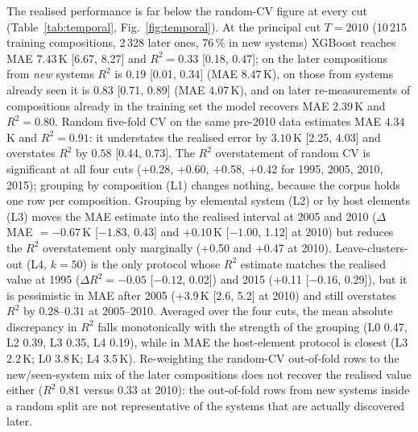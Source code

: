 The realised performance is far below the random-CV figure at every cut (Table~\ref{tab:temporal}, Fig.~\ref{fig:temporal}). At the
principal cut $T=2010$ (10\,215 training compositions, 2\,328 later ones, 76\,\% in new systems) XGBoost reaches MAE
$7.43$\,K [6.67, 8.27] and $R^2=0.33$ [0.18, 0.47]; on the later compositions from \emph{new} systems $R^2$ is $0.19$ [0.01, 0.34]
(MAE $8.47$\,K), on those from systems already seen it is $0.83$ [0.71, 0.89] (MAE $4.07$\,K), and on later re-measurements of
compositions already in the training set the model recovers MAE $2.39$\,K and $R^2=0.80$. Random five-fold CV on the same pre-2010
data estimates MAE $4.34$\,K and $R^2=0.91$: it understates the realised error by $3.10$\,K [2.25, 4.03] and overstates $R^2$ by
$0.58$ [0.44, 0.73]. The $R^2$ overstatement of random CV is significant at all four cuts (+0.28, +0.60, +0.58, +0.42 for 1995,
2005, 2010, 2015); grouping by composition (L1) changes nothing, because the corpus holds one row per composition. Grouping by
elemental system (L2) or by host elements (L3) moves the MAE estimate into the realised interval at 2005 and 2010
($\Delta$MAE $=-0.67$\,K [$-1.83$, 0.43] and $+0.10$\,K [$-1.00$, 1.12] at 2010) but reduces the $R^2$ overstatement only marginally
(+0.50 and +0.47 at 2010). Leave-clusters-out (L4, $k=50$) is the only protocol whose $R^2$ estimate matches the realised value at
1995 ($\Delta R^2=-0.05$ [$-0.12$, 0.02]) and 2015 (+0.11 [$-0.16$, 0.29]), but it is pessimistic in MAE after 2005
(+3.9\,K [2.6, 5.2] at 2010) and still overstates $R^2$ by $0.28$--$0.31$ at 2005--2010. Averaged over the four cuts, the mean
absolute discrepancy in $R^2$ falls monotonically with the strength of the grouping (L0 0.47, L2 0.39, L3 0.35, L4 0.19), while in
MAE the host-element protocol is closest (L3 2.2\,K; L0 3.8\,K; L4 3.5\,K). Re-weighting the random-CV out-of-fold rows to the
new/seen-system mix of the later compositions does not recover the realised value either ($R^2$ 0.81 versus 0.33 at 2010): the
out-of-fold rows from new systems inside a random split are not representative of the systems that are actually discovered later.

